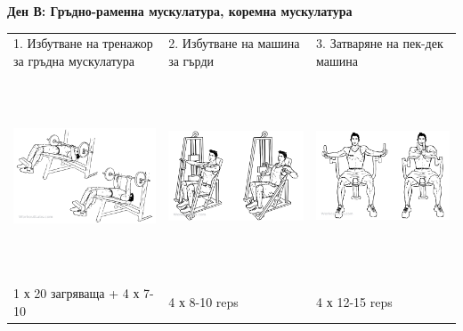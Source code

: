 \documentclass{article}
\begin{document}
\newpage
\textbf{Ден В: Гръдно-раменна мускулатура, коремна мускулатура}\\
\begin{tabular}{ | m{5cm} | m{5cm} | m{5cm} | }
\hline
1. Избутване на тренажор за гръдна мускулатура & 
2. Избутване на машина за гърди & 
3. Затваряне на пек-дек машина\\ 
\begin{minipage}{5cm} \includegraphics[width=\linewidth, height=60mm]{Decline_Barbell_Bench_Press.png} \end{minipage}&
\begin{minipage}{5cm} \includegraphics[width=\linewidth, height=60mm]{Hammer_Strength_Machine_Chest.png} \end{minipage}& 
\begin{minipage}{5cm} \includegraphics[width=\linewidth, height=60mm]{Butterfly.png} \end{minipage}\\ 
1 х 20 загряваща + 4 х 7-10 &  4 х 8-10 reps & 4 х 12-15 reps \\
\hline
\end{tabular}
\end{document}
